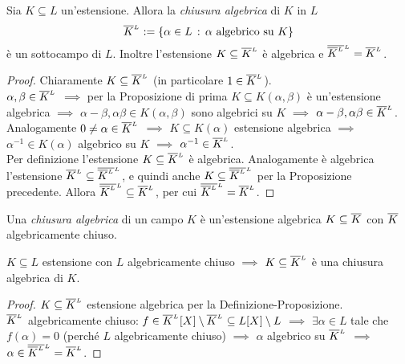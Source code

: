 
\begin{lemm}
Sia $K\subseteq L$ un'estensione. Allora la {\em chiusura algebrica} di $K$ in $L$
\[\calg[L]{K}:=\{\alpha\in L\st\text{$\alpha$ algebrico su $K$}\}\]
è un sottocampo di $L$. Inoltre l'estensione $K\subseteq\calg[L]{K}$ è algebrica e $\calg[L]{\calg[L]{K}}=\calg[L]{K}$.
\end{lemm}

\begin{proof}
Chiaramente $K\subseteq\calg[L]{K}$ (in particolare $1\in\calg[L]{K}$). \\
$\alpha,\beta\in\calg[L]{K}$ $\implies$ per la Proposizione di prima $K\subseteq K(\alpha,\beta)$ è un'estensione algebrica $\implies$ $\alpha-\beta,\alpha\beta\in K(\alpha,\beta)$ sono algebrici su $K$ $\implies$ $\alpha-\beta,\alpha\beta\in\calg[L]{K}$. \\
Analogamente $0\ne\alpha\in\calg[L]{K}$ $\implies$ $K\subseteq K(\alpha)$ estensione algebrica $\implies$ $\alpha^{-1}\in K(\alpha)$ algebrico su $K$ $\implies$ $\alpha^{-1}\in\calg[L]{K}$. \\
Per definizione l'estensione $K\subseteq\calg[L]{K}$ è algebrica. Analogamente è algebrica l'estensione $\calg[L]{K}\subseteq\calg[L]{\calg[L]{K}}$, e quindi anche $K\subseteq\calg[L]{\calg[L]{K}}$ per la Proposizione precedente. Allora $\calg[L]{\calg[L]{K}}\subseteq\calg[L]{K}$, per cui $\calg[L]{\calg[L]{K}}=\calg[L]{K}$.
\end{proof}

\begin{defi}
Una {\em chiusura algebrica} di un campo $K$ è un'estensione algebrica $K \subseteq \calg{K}$ con $\calg{K}$ algebricamente chiuso.
\end{defi}

\begin{coro}
$K\subseteq L$ estensione con $L$ algebricamente chiuso $\implies$ $K\subseteq\calg[L]{K}$ è una chiusura algebrica di $K$.
\end{coro}

\begin{proof}
$K\subseteq\calg[L]{K}$ estensione algebrica per la Definizione-Proposizione. \\
$\calg[L]{K}$ algebricamente chiuso: $f\in\calg[L]{K}[X]\setminus\calg[L]{K}\subseteq L[X]\setminus L$ $\implies$ $\exi\alpha\in L$ tale che $f(\alpha)=0$ (perché $L$ algebricamente chiuso) $\implies$ $\alpha$ algebrico su $\calg[L]{K}$ $\implies$ $\alpha\in\calg[L]{\calg[L]{K}}=\calg[L]{K}$.  
\end{proof}

